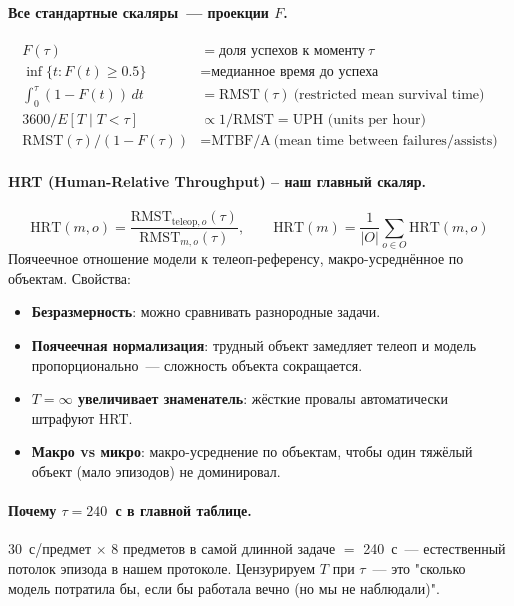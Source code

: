 \documentclass[11pt]{article}
\begin{document}
\paragraph{Все стандартные скаляры~--- проекции $F$.}
\[
\begin{aligned}
F(\tau) &= \text{доля успехов к моменту}\ \tau \\
\inf\{t: F(t) \ge 0.5\} &= \text{медианное время до успеха} \\
\int_0^\tau (1 - F(t))\,dt &= \text{RMST}(\tau)\ \text{(restricted mean survival time)} \\
3600 / E[T \mid T < \tau] &\propto 1/\text{RMST} = \text{UPH (units per hour)} \\
\text{RMST}(\tau) / (1 - F(\tau)) &= \text{MTBF/A}\ \text{(mean time between failures/assists)}
\end{aligned}
\]

\paragraph{HRT (Human-Relative Throughput) -- наш главный скаляр.}
\[
\text{HRT}(m, o) = \frac{\text{RMST}_{\text{teleop}, o}(\tau)}{\text{RMST}_{m, o}(\tau)}, \qquad \text{HRT}(m) = \frac{1}{|O|}\sum_{o \in O} \text{HRT}(m, o)
\]
Поячеечное отношение модели к телеоп-референсу, макро-усреднённое по объектам. Свойства:
\begin{itemize}[leftmargin=2em, itemsep=1pt]
\item \textbf{Безразмерность}: можно сравнивать разнородные задачи.
\item \textbf{Поячеечная нормализация}: трудный объект замедляет телеоп и модель пропорционально~--- сложность объекта сокращается.
\item \textbf{$T=\infty$ увеличивает знаменатель}: жёсткие провалы автоматически штрафуют HRT.
\item \textbf{Макро vs микро}: макро-усреднение по объектам, чтобы один тяжёлый объект (мало эпизодов) не доминировал.
\end{itemize}

\paragraph{Почему $\tau = 240$~с в главной таблице.} 30~с/предмет $\times$ 8 предметов в самой длинной задаче $=$ 240~с~--- естественный потолок эпизода в нашем протоколе. Цензурируем $T$ при $\tau$~--- это "сколько модель потратила бы, если бы работала вечно (но мы не наблюдали)".
\end{document}
